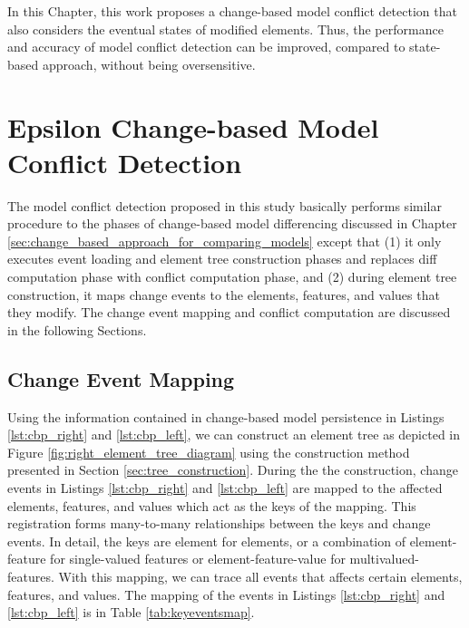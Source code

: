 In this Chapter, this work proposes a change-based model conflict detection that also considers the eventual states of modified elements. Thus, the performance and accuracy of model conflict detection can be improved, compared to state-based approach, without being oversensitive.
 
\section{Epsilon Change-based Model Conflict Detection}
\label{epsilon_change_based_model_conflict_detection}
The model conflict detection proposed in this study basically performs similar procedure to the phases of change-based model differencing discussed in Chapter \ref{sec:change_based_approach_for_comparing_models} except that (1) it only executes event loading and element tree construction phases and replaces diff computation phase with conflict computation phase, and (2) during element tree construction, it maps change events to the elements, features, and values that they modify. The change event mapping and conflict computation are discussed in the following Sections.

\subsection{Change Event Mapping}
\label{sec:change_event_mapping}
Using the information contained in change-based model persistence in Listings \ref{lst:cbp_right} and \ref{lst:cbp_left}, we can construct an element tree as depicted in Figure \ref{fig:right_element_tree_diagram} using the construction method presented in Section \ref{sec:tree_construction}. During the the construction, change events in Listings \ref{lst:cbp_right} and \ref{lst:cbp_left} are mapped to the affected elements, features, and values which act as the keys of the mapping. This registration forms many-to-many relationships between the keys and change events. In detail, the keys are \textsf{element} for elements, or a combination of \textsf{element-feature} for single-valued features or \textsf{element-feature-value} for multivalued-features. With this mapping, we can trace all events that affects certain elements, features, and values. The mapping of the events in Listings \ref{lst:cbp_right} and \ref{lst:cbp_left} is in Table \ref{tab:keyeventsmap}.

